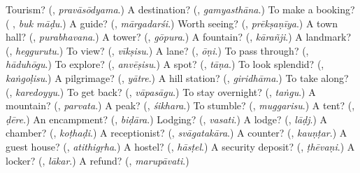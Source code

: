 \begin{tcolorbox}[breakable,colback=teal!4,colframe=teal!35!black,title={Before you move on}]
Tourism? (\textbf{}, \emph{pravāsōdyama}.) A destination? (\textbf{}, \emph{gamyasthāna}.) To make a booking? (\textbf{ }, \emph{buk māḍu}.) A guide? (\textbf{}, \emph{mārgadarśi}.) Worth seeing? (\textbf{}, \emph{prēkṣaṇīya}.) A town hall? (\textbf{}, \emph{purabhavana}.) A tower? (\textbf{}, \emph{gōpura}.) A fountain? (\textbf{}, \emph{kārañji}.) A landmark? (\textbf{}, \emph{heggurutu}.) To view? (\textbf{}, \emph{vīkṣisu}.) A lane? (\textbf{}, \emph{ōṇi}.) To pass through? (\textbf{}, \emph{hāduhōgu}.) To explore? (\textbf{}, \emph{anvēṣisu}.) A spot? (\textbf{}, \emph{tāṇa}.) To look splendid? (\textbf{}, \emph{kaṅgoḷisu}.) A pilgrimage? (\textbf{}, \emph{yātre}.) A hill station? (\textbf{}, \emph{giridhāma}.) To take along? (\textbf{}, \emph{karedoyyu}.) To get back? (\textbf{}, \emph{vāpasāgu}.) To stay overnight? (\textbf{}, \emph{taṅgu}.) A mountain? (\textbf{}, \emph{parvata}.) A peak? (\textbf{}, \emph{śikhara}.) To stumble? (\textbf{}, \emph{muggarisu}.) A tent? (\textbf{}, \emph{ḍēre}.) An encampment? (\textbf{}, \emph{biḍāra}.) Lodging? (\textbf{}, \emph{vasati}.) A lodge? (\textbf{}, \emph{lāḍj}.) A chamber? (\textbf{}, \emph{koṭhaḍi}.) A receptionist? (\textbf{}, \emph{svāgatakāra}.) A counter? (\textbf{}, \emph{kauṇṭar}.) A guest house? (\textbf{}, \emph{atithigṛha}.) A hostel? (\textbf{}, \emph{hāsṭel}.) A security deposit? (\textbf{}, \emph{ṭhēvaṇi}.) A locker? (\textbf{}, \emph{lākar}.) A refund? (\textbf{}, \emph{marupāvati}.)
\end{tcolorbox}
